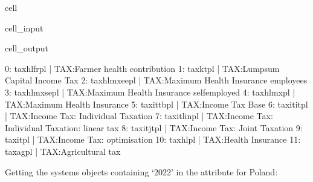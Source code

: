\documentclass[letterpaper,10pt,english]{sphinxmanual}
\begin{document}
\begin{sphinxuseclass}{cell}
\begin{sphinxuseclass}{cell_input}
\begin{sphinxVerbatim}[commandchars=\\\{\}]
\PYG{p}{[}\PYG{p}{]}
\end{sphinxVerbatim}

\end{sphinxuseclass}
\begin{sphinxuseclass}{cell_output}
\begin{sphinxVerbatim}[commandchars=\\\{\}]
0: tax\PYGZus{}hl\PYGZus{}fr\PYGZus{}pl       |    TAX:Farmer health contribution 
1: tax\PYGZus{}kt\PYGZus{}pl          |    TAX:Lump\PYGZhy{}sum Capital Income Tax 
2: tax\PYGZus{}hl\PYGZus{}mx\PYGZus{}ee\PYGZus{}pl    |    TAX:Maximum Health Insurance \PYGZhy{} employees 
3: tax\PYGZus{}hl\PYGZus{}mx\PYGZus{}se\PYGZus{}pl    |    TAX:Maximum Health Insurance \PYGZhy{} self\PYGZhy{}employed 
4: tax\PYGZus{}hl\PYGZus{}mx\PYGZus{}pl       |    TAX:Maximum Health Insurance 
5: tax\PYGZus{}it\PYGZus{}tb\PYGZus{}pl       |    TAX:Income Tax Base 
6: tax\PYGZus{}it\PYGZus{}it\PYGZus{}pl       |    TAX:Income Tax: Individual Taxation 
7: tax\PYGZus{}it\PYGZus{}lin\PYGZus{}pl      |    TAX:Income Tax: Individual Taxation: linear tax 
8: tax\PYGZus{}it\PYGZus{}jt\PYGZus{}pl       |    TAX:Income Tax: Joint Taxation 
9: tax\PYGZus{}it\PYGZus{}pl          |    TAX:Income Tax: optimisation 
10: tax\PYGZus{}hl\PYGZus{}pl         |    TAX:Health Insurance 
11: tax\PYGZus{}ag\PYGZus{}pl         |    TAX:Agricultural tax 
\end{sphinxVerbatim}

\end{sphinxuseclass}
\end{sphinxuseclass}
\sphinxAtStartPar
Getting the systems objects containing ‘2022’ in the  attribute for Poland:
\end{document}
